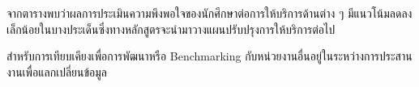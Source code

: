 จากตารางพบว่าผลการประเมินความพึงพอใจของนักศึกษาต่อการให้บริการด้านต่าง ๆ มีแนวโน้มลดลงเล็กน้อยในบางประเด็นซึ่งทางหลักสูตรจะนำมาวางแผนปรับปรุงการให้บริการต่อไป
 
สำหรับการเทียบเคียงเพื่อการพัฒนาหรือ Benchmarking กับหน่วยงานอื่นอยู่ในระหว่างการประสานงานเพื่อแลกเปลี่ยนข้อมูล 
\begin{doclist}
	
\end{doclist}









